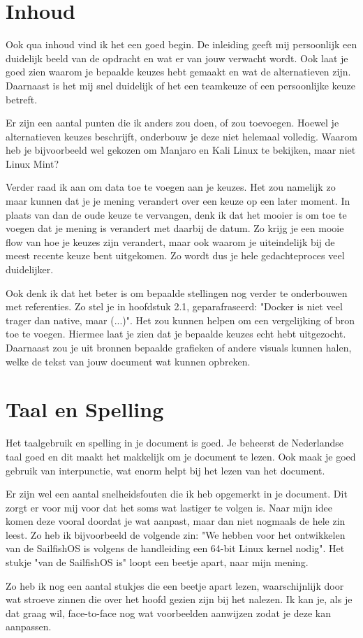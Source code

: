\documentclass[a4paper]{report}
\begin{document}
\section{Inhoud}
Ook qua inhoud vind ik het een goed begin. 
De inleiding geeft mij persoonlijk een duidelijk beeld van de opdracht en wat er van jouw verwacht wordt.
Ook laat je goed zien waarom je bepaalde keuzes hebt gemaakt en wat de alternatieven zijn. 
Daarnaast is het mij snel duidelijk of het een teamkeuze of een persoonlijke keuze betreft.
\par\smallskip 
Er zijn een aantal punten die ik anders zou doen, of zou toevoegen.
Hoewel je alternatieven keuzes beschrijft, onderbouw je deze niet helemaal volledig. 
Waarom heb je bijvoorbeeld wel gekozen om Manjaro en Kali Linux te bekijken, maar niet Linux Mint?
\par\smallskip
Verder raad ik aan om data toe te voegen aan je keuzes. Het zou namelijk zo maar kunnen dat je je mening verandert over een keuze op een later moment. 
In plaats van dan de oude keuze te vervangen, denk ik dat het mooier is om toe te voegen dat je mening is verandert met daarbij de datum.
Zo krijg je een mooie flow van hoe je keuzes zijn verandert, maar ook waarom je uiteindelijk bij de meest recente keuze bent uitgekomen. 
Zo wordt dus je hele gedachteproces veel duidelijker.
\par\smallskip
Ook denk ik dat het beter is om bepaalde stellingen nog verder te onderbouwen met referenties. 
Zo stel je in hoofdstuk 2.1, geparafraseerd: "Docker is niet veel trager dan native, maar (...)". Het zou kunnen helpen om een vergelijking of bron toe te voegen. 
Hiermee laat je zien dat je bepaalde keuzes echt hebt uitgezocht. Daarnaast zou je uit bronnen bepaalde grafieken of andere visuals kunnen halen, welke de tekst van jouw document wat kunnen opbreken.

\section{Taal en Spelling}
Het taalgebruik en spelling in je document is goed. Je beheerst de Nederlandse taal goed en dit maakt het makkelijk om je document te lezen.
Ook maak je goed gebruik van interpunctie, wat enorm helpt bij het lezen van het document. 
\par\smallskip 
Er zijn wel een aantal snelheidsfouten die ik heb opgemerkt in je document. Dit zorgt er voor mij voor dat het soms wat lastiger te volgen is. 
Naar mijn idee komen deze vooral doordat je wat aanpast, maar dan niet nogmaals de hele zin leest. 
Zo heb ik bijvoorbeeld de volgende zin: "We hebben voor het ontwikkelen van de SailfishOS is volgens de handleiding een 64-bit Linux kernel nodig".  
Het stukje "van de SailfishOS is" loopt een beetje apart, naar mijn mening. 
\par\smallskip 
Zo heb ik nog een aantal stukjes die een beetje apart lezen, waarschijnlijk door wat stroeve zinnen die over het hoofd gezien zijn bij het nalezen.
Ik kan je, als je dat graag wil, face-to-face nog wat voorbeelden aanwijzen zodat je deze kan aanpassen.
\end{document}
